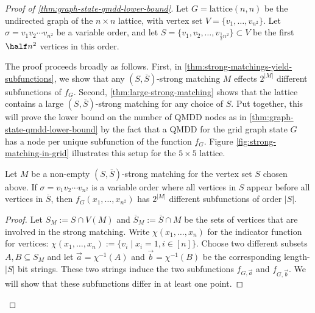 \begin{proof}[Proof of \autoref{thm:graph-state-qmdd-lower-bound}]
%	
Let $G=\text{lattice}(n,n)$ be the undirected graph of the $n\times n$ lattice,
with vertex set $V=\{v_1,\ldots, v_{n^2}\}$.
Let $\sigma=v_1v_2\cdots v_{n^2}$ be a variable order, and let $S=\{v_1,v_2,\ldots, v_{\frac{1}{2}n^2}\}\subset V$ be the first $\half n^2$ vertices in this order.

The proof proceeds broadly as follows.
First, in \autoref{thm:strong-matchings-yield-subfunctions}, we show that any $(S,\overline S)$-strong matching $M$ effects $2^{|M|}$ different subfunctions of $f_G$.
Second, \autoref{thm:large-strong-matching} shows that the lattice contains a large $(S,\overline S)$-strong matching for any choice of $S$.
    Put together, this will prove the lower bound on the number of QMDD nodes as in \autoref{thm:graph-state-qmdd-lower-bound} by the fact that a QMDD for the grid graph state $G$ has a node per unique subfunction of the function $f_G$.
	Figure \ref{fig:strong-matching-in-grid} illustrates this setup for the $5\times 5$ lattice.

\begin{lemma}
	\label{thm:strong-matchings-yield-subfunctions}
	Let $M$ be a non-empty $(S,\overline S)$-strong matching for the vertex set $S$ chosen above.
	If $\sigma=v_1v_2\cdots v_{n^2}$ is a variable order where all vertices in $S$ appear before all vertices in $\overline S$, then $f_G(x_1,\ldots, x_{n^2})$ has $2^{|M|}$ different subfunctions of order $|S|$.
\end{lemma}
\begin{proof}
	Let $S_M:=S\cap V(M)$ and $\overline S_M:=\overline S\cap M$ be the sets of vertices that are involved in the strong matching.
Write $\chi(x_1, \dots, x_n)$ for the indicator function for vertices: $\chi(x_1, \dots, x_n) := \{v_i \mid x_i=1, i \in [n]\} $.
	Choose two different subsets $A,B\subseteq S_M$ and let $\vec{a}=\chi^{-1}(A)$ and $\vec{b}=\chi^{-1}(B)$ be the corresponding length-$|S|$ bit strings.
	These two strings induce the two subfunctions $f_{G,\vec{a}}$ and $f_{G,\vec{b}}$.
	We will show that these subfunctions differ in at least one point.
	

\end{proof}
\end{proof}
